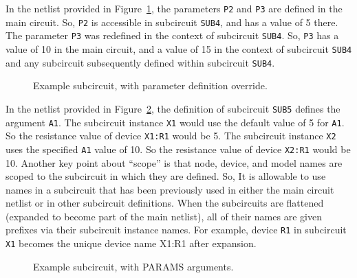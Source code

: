 In the netlist provided in Figure~\ref{Subcircuit_Example_3}, the parameters
\texttt{P2} and \texttt{P3} are defined in the main circuit.  So, \texttt{P2}
is accessible in subcircuit \texttt{SUB4}, and has a value of 5 there. The
parameter \texttt{P3} was redefined in the context of subcircuit \texttt{SUB4}.
So, \texttt{P3} has a value of 10 in the main circuit, and a value of 15
in the context of subcircuit \texttt{SUB4} and any subcircuit subsequently 
defined within subcircuit \texttt{SUB4}.  
\begin{figure}[H]
\begin{centering}
\caption{Example subcircuit, with parameter definition override.\label{Subcircuit_Example_3}}
\end{centering}
\end{figure}

In the netlist provided in Figure~\ref{Subcircuit_Example_4}, the 
definition of subcircuit \texttt{SUB5} defines the argument \texttt{A1}.
The subcircuit instance \texttt{X1} would use the default value of 5
for \texttt{A1}.  So the resistance value of device \texttt{X1:R1}
would be 5.  The subcircuit instance \texttt{X2} uses the specified
\texttt{A1} value of 10. So the resistance value of device \texttt{X2:R1}
would be 10.  Another key point about ``scope'' is that node, device, and
model names are scoped to the subcircuit in which they are defined. 
So, It is allowable to use names in a subcircuit that has been previously
used in either the main circuit netlist or in other subcircuit definitions.   
When the subcircuits are flattened (expanded to become part of the main 
netlist), all of their names are given prefixes via their subcircuit 
instance names. For example, device \texttt{R1} in subcircuit \texttt{X1} 
becomes the unique device name X1:R1 after expansion. 
\begin{figure}[H]
\begin{centering}
\caption{Example subcircuit, with PARAMS arguments.\label{Subcircuit_Example_4}}
\end{centering}
\end{figure}

